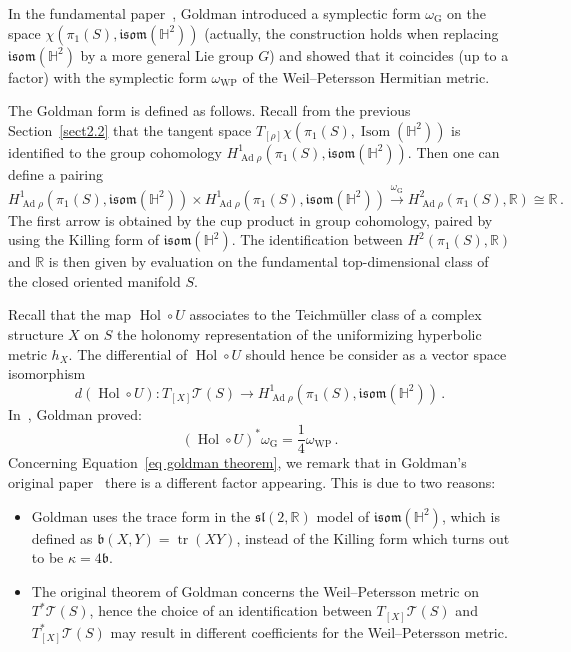\documentclass[11pt]{article}
\theoremstyle{definition}
\numberwithin{equation}{section}
\numberwithin{figure}{section}
\numberwithin{table}{section}
\newcommand{\Teich}{\mathcal{T}}
\newcommand{\weil}{{\mathrm{W}\!\mathrm{P}}}
\newcommand{\Hyp}{\mathbb{H}}
\newcommand{\R}{{\mathbb R}}
\newcommand{\isom}{\mathfrak{isom}}
\DeclareMathOperator{\tr}{tr}
\DeclareMathOperator{\Isom}{Isom}
\DeclareMathOperator{\Ad}{Ad}
\DeclareMathOperator{\Hol}{Hol}
\begin{document}
In the fundamental paper~\cite{Goldman}, Goldman introduced a symplectic form $\omega_{\mathrm G}$ on the space $\chi(\pi_1(S),\isom(\Hyp^2))$ (actually, the construction holds when replacing $\isom(\Hyp^2)$ by a more general Lie group $G$) and showed that it coincides (up to a factor) with the symplectic form $\omega_{\weil}$ of the Weil--Petersson Hermitian metric.

The Goldman form is defined as follows. Recall from the previous Section~\ref{sect2.2} that the tangent space $T_{[\rho]}\chi(\pi_1(S),\Isom(\Hyp^2))$ is identified to the group cohomology $H^1_{\Ad\rho}(\pi_1(S),\isom(\Hyp^2))$. Then one can define a pairing
\[
H^1_{\Ad\rho}\left(\pi_1(S),\isom(\Hyp^2)\right)\times H^1_{\Ad\rho}\left(\pi_1(S),\isom(\Hyp^2)\right)\xrightarrow{\omega_{\mathrm G}} H^2_{\Ad\rho}(\pi_1(S),\R)\cong\R\,.
\]
The first arrow is obtained by the cup product in group cohomology, paired by using the Killing form of $\isom(\Hyp^2)$. The identification between $H^2(\pi_1(S),\R)$ and $\R$ is then given by evaluation on the fundamental top-dimensional class of the closed oriented manifold $S$.

Recall that the map $\Hol\circ U$ associates to the Teichm\"uller class of a complex structure $X$ on $S$ the holonomy representation of the uniformizing hyperbolic metric $h_X$. The differential of $\Hol\circ U$ should hence be consider as a vector space isomorphism
\[
d(\Hol\circ U):T_{[X]}\Teich(S)\to H^1_{\Ad\rho}\left(\pi_1(S),\isom(\Hyp^2)\right)\,.
\]
In~\cite{Goldman}, Goldman proved:
\begin{equation}\label{eq goldman theorem}
(\Hol\circ U)^*\omega_{\mathrm G}=\frac{1}{4}\omega_\weil\,.
\end{equation}
Concerning Equation~\eqref{eq goldman theorem}, we remark that in Goldman's original paper~\cite{Goldman} there is a different factor appearing. This is due to two reasons:
\begin{itemize}
\item Goldman uses the trace form in the $\mathfrak{sl}(2,\R)$ model of $\isom(\Hyp^2)$, which is defined as $\mathfrak b(X,Y)=\tr(XY)$, instead of the Killing form which turns out to be $\kappa=4\mathfrak b$.
\item The original theorem of Goldman concerns the Weil--Petersson metric on $T^*\Teich(S)$, hence the choice of an identification between $T_{[X]}\Teich(S)$ and $T^*_{[X]}\Teich(S)$ may result in different coefficients for the Weil--Petersson metric.
\end{itemize}
\end{document}
